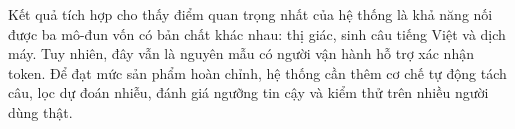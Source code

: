 Kết quả tích hợp cho thấy điểm quan trọng nhất của hệ thống là khả năng nối được ba mô-đun vốn có bản chất khác nhau: thị giác, sinh câu tiếng Việt và dịch máy. Tuy nhiên, đây vẫn là nguyên mẫu có người vận hành hỗ trợ xác nhận token. Để đạt mức sản phẩm hoàn chỉnh, hệ thống cần thêm cơ chế tự động tách câu, lọc dự đoán nhiễu, đánh giá ngưỡng tin cậy và kiểm thử trên nhiều người dùng thật.

